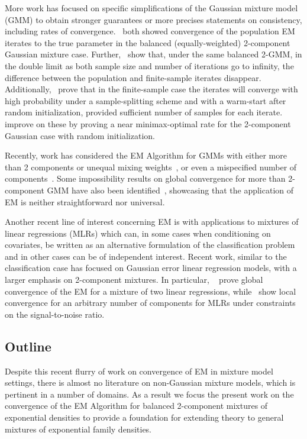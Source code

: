 \documentclass[runningheads]{llncs}
\begin{document}
More work has focused on specific simplifications of the Gaussian mixture
model (GMM) to obtain stronger guarantees or more precises statements on
consistency, including rates of convergence.~\cite{xu2016global, daskalakis2017ten} both showed convergence of the
population EM iterates to the true parameter in the balanced (equally-weighted)
2-component Gaussian mixture case. Further,~\cite{xu2016global} show that, under
the same balanced 2-GMM, in the double limit as both sample size and number of
iterations go to infinity, the difference between the population and
finite-sample iterates disappear.
Additionally,~\cite{daskalakis2017ten} prove that in the finite-sample case the
iterates will converge with high probability under a sample-splitting scheme and with a
warm-start after random initialization, provided sufficient number of samples for each
iterate.~\cite{wu2019randomly} improve on these
by proving a near minimax-optimal rate for the 2-component Gaussian case with
random initialization.

Recently, work has considered the EM Algorithm for GMMs with either more than 2
components or unequal mixing weights~\cite{zhao2020statistical}, or even a
mispecified number of components~\cite{dwivedi2020singularity}. Some
impossibility results on global convergence for more than 2-component
GMM have also been identified~\cite{jin2016local}, showcasing that the application
of EM is neither straightforward nor universal.

Another recent line of interest concerning EM is with applications to mixtures of
linear regressions (MLRs) which can, in some cases when conditioning on
covariates, be written as an alternative formulation of the classification
problem \cite{viele2002modeling, tao2024convergence} and in other cases can be
of independent interest. Recent work, similar to the classification case has
focused on Gaussian error linear regression models, with a larger emphasis on
2-component mixtures. In particular, ~\cite{kwon2019global} prove global convergence of
the EM for a mixture of two linear regressions, while~\cite{kwon2020converges}
show local convergence for an arbitrary number of components for MLRs under
constraints on the signal-to-noise ratio.


\subsection{Outline}
Despite this recent flurry of work on convergence of EM in mixture model
settings, there is almost no literature on non-Gaussian mixture models, which is pertinent in a number of domains.
As a result we focus the present work on the convergence of the EM Algorithm for
balanced 2-component mixtures of exponential densities to provide a foundation
for extending theory to general mixtures of exponential family densities.
\end{document}
